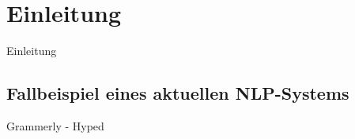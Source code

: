 \chapter{Einleitung}\label{ch:intro}

Einleitung


\section{Fallbeispiel eines aktuellen NLP-Systems}

Grammerly - Hyped